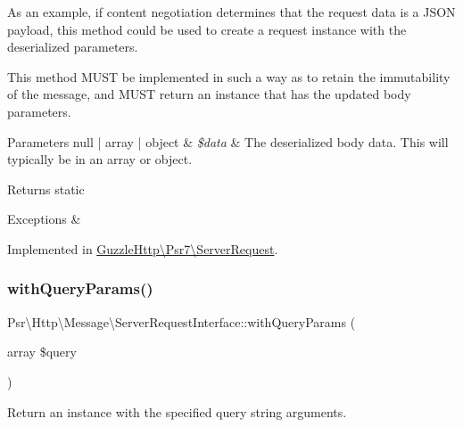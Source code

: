 As an example, if content negotiation determines that the request data is a J\+S\+ON payload, this method could be used to create a request instance with the deserialized parameters.

This method M\+U\+ST be implemented in such a way as to retain the immutability of the message, and M\+U\+ST return an instance that has the updated body parameters.


\begin{DoxyParams}[1]{Parameters}
null | array | object & {\em \$data} & The deserialized body data. This will typically be in an array or object. \\
\hline
\end{DoxyParams}
\begin{DoxyReturn}{Returns}
static 
\end{DoxyReturn}

\begin{DoxyExceptions}{Exceptions}
{\em } & \\
\hline
\end{DoxyExceptions}


Implemented in \hyperlink{classGuzzleHttp_1_1Psr7_1_1ServerRequest_a7213bb1e535098e50d40f614f085d3fc}{Guzzle\+Http\textbackslash{}\+Psr7\textbackslash{}\+Server\+Request}.

\mbox{\label{interfacePsr_1_1Http_1_1Message_1_1ServerRequestInterface_aa291bcf612e3f975b929eeb6a23afbf6}} 
\subsubsection{\texorpdfstring{with\+Query\+Params()}{withQueryParams()}}
{\footnotesize\ttfamily Psr\textbackslash{}\+Http\textbackslash{}\+Message\textbackslash{}\+Server\+Request\+Interface\+::with\+Query\+Params (\begin{DoxyParamCaption}\item[{array}]{\$query }\end{DoxyParamCaption})}

Return an instance with the specified query string arguments.

